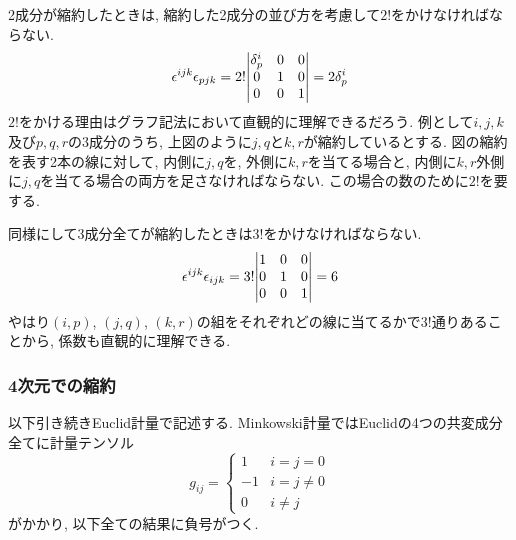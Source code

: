 \documentclass[dvipdfmx]{jsarticle}
\begin{document}
2成分が縮約したときは, 縮約した2成分の並び方を考慮して$2!$をかけなければならない.
\begin{align*}
    \epsilon^{ijk}\epsilon_{pjk}
    =
    2!
    \mqty|
        \delta^i_p & 0 & 0
        \\
        0 & 1 & 0
        \\
        0 & 0 & 1
    |
    =2\delta^i_p
\end{align*}
\begin{equation*}
    
\end{equation*}
$2!$をかける理由はグラフ記法において直観的に理解できるだろう.
例として$i,j,k$及び$p,q,r$の3成分のうち, 上図のように$j,q$と$k,r$が縮約しているとする.
図の縮約を表す2本の線に対して, 内側に$j,q$を, 外側に$k,r$を当てる場合と, 内側に$k,r$外側に$j,q$を当てる場合の両方を足さなければならない.
この場合の数のために$2!$を要する.

同様にして3成分全てが縮約したときは$3!$をかけなければならない.
\begin{align*}
    \epsilon^{ijk}\epsilon_{ijk}
    =
    3!
    \mqty|
        1 & 0 & 0
        \\
        0 & 1 & 0
        \\
        0 & 0 & 1
    |
    =6
\end{align*}
\begin{equation*}
    
\end{equation*}
やはり$(i,p)$, $(j,q)$, $(k,r)$の組をそれぞれどの線に当てるかで$3!$通りあることから, 係数も直観的に理解できる.


\subsubsection{4次元での縮約}

以下引き続きEuclid計量で記述する.
Minkowski計量ではEuclidの4つの共変成分全てに計量テンソル
\begin{equation*}
    g_{ij}=
    \begin{cases}
        1 & i=j=0
        \\
        -1 & i=j\neq0
        \\
        0 & i\neq j
    \end{cases}
\end{equation*}
がかかり, 以下全ての結果に負号がつく.
\end{document}
